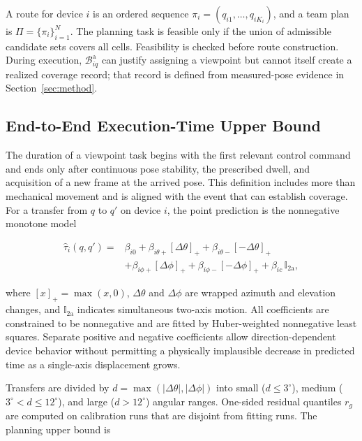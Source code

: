 A route for device $i$ is an ordered sequence $\pi_i=(q_{i1},\ldots,q_{iK_i})$, and a team plan is $\Pi=\{\pi_i\}_{i=1}^{N}$. The planning task is feasible only if the union of admissible candidate sets covers all cells. Feasibility is checked before route construction. During execution, $\mathcal B^{\mathrm a}_{iq}$ can justify assigning a viewpoint but cannot itself create a realized coverage record; that record is defined from measured-pose evidence in Section~\ref{sec:method}.

\subsection{End-to-End Execution-Time Upper Bound}

The duration of a viewpoint task begins with the first relevant control command and ends only after continuous pose stability, the prescribed dwell, and acquisition of a new frame at the arrived pose. This definition includes more than mechanical movement and is aligned with the event that can establish coverage. For a transfer from $q$ to $q'$ on device $i$, the point prediction is the nonnegative monotone model

\begin{equation}\label{eq:time-point}
\begin{split}
\hat\tau_i(q,q')={}&\beta_{i0}+\beta_{i\theta+}[\Delta\theta]_+
+\beta_{i\theta-}[-\Delta\theta]_+\\
&+\beta_{i\phi+}[\Delta\phi]_+
+\beta_{i\phi-}[-\Delta\phi]_+
+\beta_{ic}\,\mathbb I_{2\mathrm a},
\end{split}
\end{equation}

where $[x]_+=\max(x,0)$, $\Delta\theta$ and $\Delta\phi$ are wrapped azimuth and elevation changes, and $\mathbb I_{2\mathrm a}$ indicates simultaneous two-axis motion. All coefficients are constrained to be nonnegative and are fitted by Huber-weighted nonnegative least squares. Separate positive and negative coefficients allow direction-dependent device behavior without permitting a physically implausible decrease in predicted time as a single-axis displacement grows.

Transfers are divided by $d=\max(|\Delta\theta|,|\Delta\phi|)$ into small ($d\leq3^\circ$), medium ($3^\circ<d\leq12^\circ$), and large ($d>12^\circ$) angular ranges. One-sided residual quantiles $r_g$ are computed on calibration runs that are disjoint from fitting runs. The planning upper bound is

